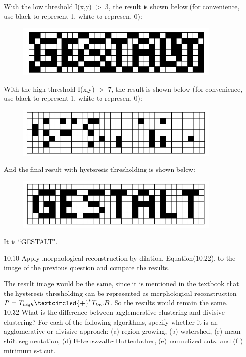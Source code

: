 \documentclass[a4paper]{article}
\begin{document}
\begin{spacing}{2.0}
	With the low threshold I(x,y) $>$ 3, the result is shown below (for convenience, use black to represent 1, white to represent 0):
	\begin{figure}[htbp]
	 \includegraphics[width=4in]{low.jpg}
	\end{figure}
	
	With the high threshold I(x,y) $>$ 7, the result is shown below (for convenience, use black to represent 1, white to represent 0):
	\begin{figure}[htbp]
	 \includegraphics[width=4in]{high.jpg}
	\end{figure}
	
	And the final result with hysteresis thresholding is shown below:
	\begin{figure}[H]
	 \includegraphics[width=4in]{result.jpg}
	\end{figure}
	It is ``GESTALT".
	
	10.10 Apply morphological reconstruction by dilation, Equation(10.22), to the image of the previous question and compare the results.
	
	The result image would be the same, since it is mentioned in the textbook that the hysteresis thresholding can be represented as morphological reconstruction $I' = T_{high}\textcircled{+}^*T_{low}B$. So the results would remain the same.\\

 	10.32 What is the difference between agglomerative clustering and divisive clustering?
For each of the following algorithms, specify whether it is an agglomerative or divisive approach: (a) region growing, (b) watershed, (c) mean shift segmentation, (d) Felzenszwalb- Huttenlocher, (e) normalized cuts, and (f ) minimum s-t cut.


\end{spacing}
\end{document}
